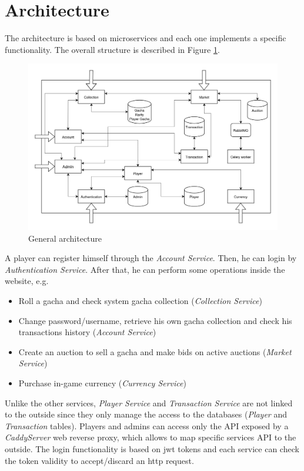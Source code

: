 \documentclass{article}
\begin{document}
\section{Architecture}
The architecture is based on microservices and each one implements a specific functionality. The overall structure is described in Figure \ref{fig:general_architecture}.
\begin{figure}[ht]
    \centering
    \includegraphics[width=12cm]{architecture-v2.drawio.png}
    \caption{General architecture}
    \label{fig:general_architecture}
\end{figure}

A player can register himself through the \emph{Account Service}. Then, he can login by \emph{Authentication Service}. After that, he can perform some operations inside the website, e.g.
\begin{itemize}
    \item Roll a gacha and check system gacha collection (\emph{Collection Service})
    \item Change password/username, retrieve his own gacha collection and check his transactions history (\emph{Account Service})
    \item Create an auction to sell a gacha and make bids on active auctions (\emph{Market Service})
    \item Purchase in-game currency (\emph{Currency Service})
\end{itemize}
Unlike the other services, \emph{Player Service} and \emph{Transaction Service} are not linked to the outside since they only manage the access to the databases (\emph{Player} and \emph{Transaction} tables). Players and admins can access only the API exposed by a \emph{CaddyServer} web reverse proxy, which allows to map specific services API to the outside. The login functionality is based on jwt tokens and each service can check the token validity to accept/discard an http request.
\end{document}
